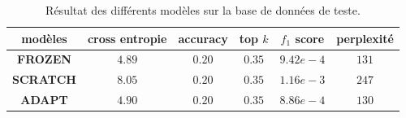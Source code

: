 \documentclass[a4paper]{article}
\begin{document}



\begin{table}
    \centering
    \begin{tabular}{|c|c|c|c|c|c|}
        \hline
        modèles & cross entropie & accuracy & top $k$ & $f_1$ score & perplexité \\
        \hline
        \textbf{FROZEN} & $4.89$ &  $0.20$ & $0.35$ & $9.42e-4$ & $131$ \\
        \textbf{SCRATCH} & $8.05$ &  $0.20$ & $0.35$ & $1.16e-3$ & $247$ \\
        \textbf{ADAPT} & $4.90$ &  $0.20$ & $0.35$ & $8.86e-4$ & $130$ \\
        \hline
    \end{tabular}
    \caption{Résultat des différents modèles sur la base de données de teste.}
    \label{tab:allresults}
\end{table}



\newpage

\printbibliography
\end{document}
